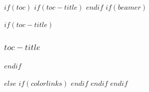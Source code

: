 \documentclass[
$if(fontsize)$
  $fontsize$,
$endif$
$if(papersize)$
  $papersize$paper,
$endif$
$for(classoption)$
  $classoption$$sep$,
$endfor$
]{$documentclass$}
\theoremstyle{thmstyleone}%
\theoremstyle{thmstyletwo}%
\theoremstyle{thmstylethree}%
\begin{document}
% 
% 
% 




\maketitle


$if(toc)$
$if(toc-title)$
\renewcommand*\contentsname{$toc-title$}
$endif$
$if(beamer)$
\begin{frame}[allowframebreaks]
$if(toc-title)$
  \frametitle{$toc-title$}
$endif$
  \tableofcontents[hideallsubsections]
\end{frame}
$else$
{
$if(colorlinks)$
\hypersetup{linkcolor=$if(toccolor)$$toccolor$$else$$endif$}
$endif$
\setcounter{tocdepth}{$toc-depth$}
\tableofcontents
}
$endif$
$endif$
\end{document}
